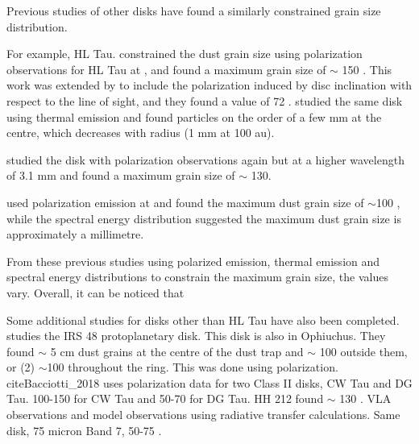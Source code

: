 






Previous studies of other disks have found a similarly constrained grain size distribution. 

For example, HL Tau. 
\cite{Kataoka2016} constrained the dust grain size using polarization observations for HL Tau at \bsixNS, and found a maximum grain size of $\sim$ 150 \micronNS. 
This work was extended by \cite{Yang2016} to include the polarization induced by disc inclination with respect to the line of sight, and they found a value of 72 \micronNS. 
\cite{Carrasco} studied the same disk using thermal emission and found particles on the order of a few mm at the centre, which decreases with radius (1 mm at 100 au). 

\cite{Mori} studied the disk with polarization observations again but at a higher wavelength of 3.1 mm and found a maximum grain size of $\sim$ 130. 


\cite{Ueda} used polarization emission at \beven and found the maximum dust grain size of $\sim$100 \micronNS, while the spectral energy distribution suggested the maximum dust grain size is approximately a millimetre. 

From these previous studies using polarized emission, thermal emission and spectral energy distributions to constrain the maximum grain size, the values vary. Overall, it can be noticed that 

Some additional studies for disks other than HL Tau have also been completed. \cite{Ohashi} studies the IRS 48 protoplanetary disk. This disk is also in Ophiuchus. They found $\sim$ 5 cm dust grains at the centre of the dust trap and $\sim$ 100 \micron outside them, or (2) $\sim$100 \micron throughout the ring. This was done using polarization. cite{Bacciotti_2018} uses polarization data for two Class II disks, CW Tau and DG Tau. 100-150 \micron for CW Tau and 50-70 \micron for DG Tau.  \cite{Hu} HH 212 found $\sim$ 130 \micron. VLA observations and model observations using radiative transfer calculations. Same disk, \cite{Lee_2021} 75 micron Band 7, 50-75 \micronNS. 

